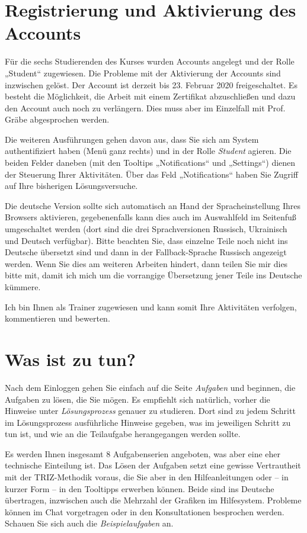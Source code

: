 \documentclass[11pt,a4paper]{article}
\begin{document}
\section{Registrierung und Aktivierung des Accounts}

Für die sechs Studierenden des Kurses wurden Accounts angelegt und der Rolle
„Student“ zugewiesen.  Die Probleme mit der Aktivierung der Accounts sind
inzwischen gelöst. Der Account ist derzeit bis 23. Februar 2020
freigeschaltet.  Es besteht die Möglichkeit, die Arbeit mit einem Zertifikat
abzuschließen und dazu den Account auch noch zu verlängern. Dies muss aber im
Einzelfall mit Prof. Gräbe abgesprochen werden. 

Die weiteren Ausführungen gehen davon aus, dass Sie sich am System
authentifiziert haben (Menü ganz rechts) und in der Rolle \emph{Student}
agieren.  Die beiden Felder daneben (mit den Tooltips „Notifications“ und
„Settings“) dienen der Steuerung Ihrer Aktivitäten. Über das Feld
„Notifications“ haben Sie Zugriff auf Ihre bisherigen Lösungsversuche.

Die deutsche Version sollte sich automatisch an Hand der Spracheinstellung
Ihres Browsers aktivieren, gegebenenfalls kann dies auch im Auswahlfeld im
Seitenfuß umgeschaltet werden (dort sind die drei Sprachversionen Russisch,
Ukrainisch und Deutsch verfügbar).  Bitte beachten Sie, dass einzelne Teile
noch nicht ins Deutsche übersetzt sind und dann in der Fallback-Sprache
Russisch angezeigt werden. Wenn Sie dies am weiteren Arbeiten hindert, dann
teilen Sie mir dies bitte mit, damit ich mich um die vorrangige Übersetzung
jener Teile ins Deutsche kümmere.

Ich bin Ihnen als Trainer zugewiesen und kann somit Ihre Aktivitäten
verfolgen, kommentieren und bewerten.

\section{Was ist zu tun?}

Nach dem Einloggen gehen Sie einfach auf die Seite \emph{Aufgaben} und
beginnen, die Aufgaben zu lösen, die Sie mögen.  Es empfiehlt sich natürlich,
vorher die Hinweise unter \emph{Lösungsprozess} genauer zu studieren.  Dort
sind zu jedem Schritt im Lösungsprozess ausführliche Hinweise gegeben, was im
jeweiligen Schritt zu tun ist, und wie an die Teilaufgabe herangegangen werden
sollte. 

Es werden Ihnen insgesamt 8 Aufgabenserien angeboten, was aber eine eher
technische Einteilung ist.  Das Lösen der Aufgaben setzt eine gewisse
Vertrautheit mit der TRIZ-Methodik voraus, die Sie aber in den
Hilfeanleitungen oder -- in kurzer Form -- in den Tooltipps erwerben können.
Beide sind ins Deutsche übertragen, inzwischen auch die Mehrzahl der Grafiken
im Hilfesystem. Probleme können im Chat vorgetragen oder in den Konsultationen
besprochen werden.  Schauen Sie sich auch die \emph{Beispielaufgaben} an.
\end{document}
